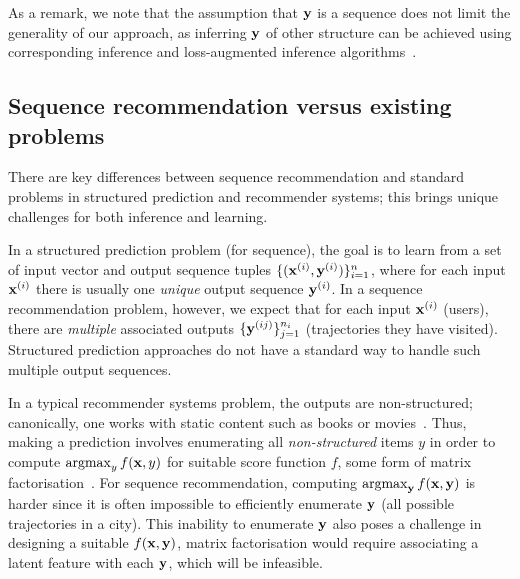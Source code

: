 As a remark, we note that the assumption that $\mathbf{y}$ is a sequence does not limit the generality of our approach,
as inferring $\mathbf{y}$ of other structure can be achieved using corresponding inference and loss-augmented inference algorithms~\cite{joachims2009predicting}.  %


%
\subsection{Sequence recommendation versus existing problems}

There are key differences between sequence recommendation and %
standard problems in structured prediction and recommender systems;
this brings unique challenges for both inference and learning.

In a structured prediction problem (for sequence), the goal is to learn from a set of
input vector and output sequence tuples %
$\{ (\mathbf{x}^{({i})}, \mathbf{y}^{({i})}) \}_{i = 1}^n$, where
for each input $\mathbf{x}^{({i})}$ there is usually one \emph{unique} output sequence $\mathbf{y}^{({i})}$.
In a sequence recommendation problem, however, we expect that %
for each input $\mathbf{x}^{({i})}$ (\eg users),
there %
are \emph{multiple} associated outputs %
$\{ \mathbf{y}^{({ij})} \}_{j=1}^{n_i}$ (\eg trajectories they have visited).
Structured prediction approaches do not have a standard way to handle such multiple output sequences.

In a typical recommender systems problem, the outputs are non-structured; canonically, one works with {static} content such as books or movies~\citep{Goldberg:1992,Sarwar:2001,Netflix}.
Thus, making a prediction involves enumerating all {\em non-structured} items $y$ in order to compute $\operatorname*{argmax}_y f(\mathbf{x},y)$ for suitable score function $f$, \eg some form of matrix factorisation~\citep{Koren:2009}.
For sequence recommendation, computing $\operatorname*{argmax}_{\mathbf{y}} f(\mathbf{x},\mathbf{y})$ is harder since it is often impossible to efficiently enumerate $\mathbf{y}$ (\eg all possible trajectories in a city).
This inability to enumerate $\mathbf{y}$ also poses a challenge in designing a suitable $f(\mathbf{x},\mathbf{y})$,
\eg
matrix factorisation
would require associating a latent feature with each $\mathbf{y}$, which will be infeasible.


